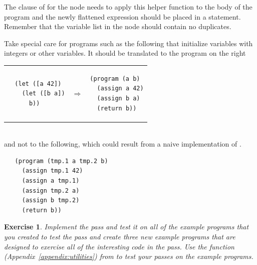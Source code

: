 \documentclass[11pt]{book}
\newtheorem{exercise}[theorem]{Exercise}
\begin{document}
The clause of  for the  node needs to
apply this helper function to the body of the program and the newly flattened
expression should be placed in a  statement. Remember that
the variable list in the  node should contain no duplicates.


Take special care for programs such as the following that initialize
variables with integers or other variables. It should be translated
to the program on the right \\
\begin{tabular}{lll}
\begin{minipage}{0.4\textwidth}
\begin{lstlisting}
  (let ([a 42])
    (let ([b a])
      b))
\end{lstlisting}
\end{minipage}
&
$\Rightarrow$
&
\begin{minipage}{0.4\textwidth}
\begin{lstlisting}
(program (a b)
  (assign a 42)
  (assign b a)
  (return b))
\end{lstlisting}
\end{minipage}
\end{tabular} \\
and not to the following, which could result from a naive
implementation of .
\begin{lstlisting}
   (program (tmp.1 a tmp.2 b)
     (assign tmp.1 42)
     (assign a tmp.1)
     (assign tmp.2 a)
     (assign b tmp.2)
     (return b))
\end{lstlisting}

\begin{exercise}
\normalfont
Implement the  pass and test it on all of the example
programs that you created to test the  pass and create
three new example programs that are designed to exercise all of the
interesting code in the  pass. Use the 
function (Appendix~\ref{appendix:utilities}) from  to
test your passes on the example programs.
\end{exercise}
\end{document}
